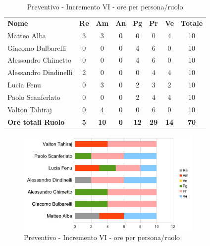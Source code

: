 \begin{table} [h!]
	\begin{center}
		\begin{tabular} { m{3.5cm} c c c c c c c }
			\rowcolor{lightgray}
			\textbf{Nome} & \textbf{Re} & \textbf{Am} & \textbf{An} & \textbf{Pg} & \textbf{Pr} & \textbf{Ve} & \textbf{Totale} \\
			Matteo Alba & 3 & 3 & 0 & 0 & 0 & 4 & 10 \\
			Giacomo Bulbarelli & 0 & 0 & 0 & 4 & 6 & 0 & 10 \\
			Alessandro Chimetto & 0 & 0 & 0 & 4 & 6 & 0 & 10 \\
			Alessandro Dindinelli & 2 & 0 & 0 & 0 & 4 & 4 & 10 \\
			Lucia Fenu & 0 & 3 & 0 & 2 & 3 & 2 & 10 \\
			Paolo Scanferlato & 0 & 0 & 0 & 2 & 4 & 4 & 10 \\
			Valton Tahiraj & 0 & 4 & 0 & 0 & 6 & 0 & 10 \\
			\textbf{Ore totali Ruolo} & \textbf{5} & \textbf{10} & \textbf{0} & \textbf{12} & \textbf{29}& \textbf{14} & \textbf{70}
		\end{tabular}
		\caption{Preventivo - Incremento VI - ore per persona/ruolo}
	\end{center}
\end{table}
\begin{figure} [h!]
	\centering
	\includegraphics[width=0.8\textwidth]{res/img/grafici/Incremento6Ore.jpg}
	\caption{Preventivo - Incremento VI - ore per persona/ruolo} 
\end{figure}

\newpage
